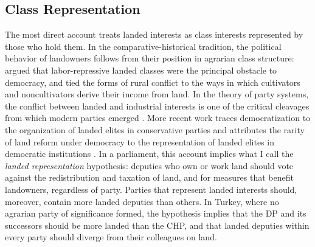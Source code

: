 \documentclass[12pt]{article}
\begin{document}
\subsection*{Class Representation}

The most direct account treats landed interests as class interests represented by those who hold them. In the comparative-historical tradition, the political behavior of landowners follows from their position in agrarian class structure: \citet{moore1966} argued that labor-repressive landed classes were the principal obstacle to democracy, and \citet{paige1975} tied the forms of rural conflict to the ways in which cultivators and noncultivators derive their income from land. In the theory of party systems, the conflict between landed and industrial interests is one of the critical cleavages from which modern parties emerged \citep{lipset1967}. More recent work traces democratization to the organization of landed elites in conservative parties \citep{ziblatt2017} and attributes the rarity of land reform under democracy to the representation of landed elites in democratic institutions \citep{albertus2015}. In a parliament, this account implies what I call the \textit{landed representation} hypothesis: deputies who own or work land should vote against the redistribution and taxation of land, and for measures that benefit landowners, regardless of party. Parties that represent landed interests should, moreover, contain more landed deputies than others. In Turkey, where no agrarian party of significance formed, the hypothesis implies that the DP and its successors should be more landed than the CHP, and that landed deputies within every party should diverge from their colleagues on land.
\end{document}
